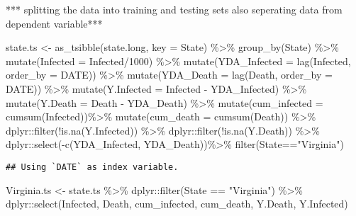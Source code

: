 \documentclass[
]{article}
\newenvironment{Shaded}{\begin{snugshade}}{\end{snugshade}}
\newcommand{\AttributeTok}[1]{\textcolor[rgb]{0.77,0.63,0.00}{#1}}
\newcommand{\DecValTok}[1]{\textcolor[rgb]{0.00,0.00,0.81}{#1}}
\newcommand{\FunctionTok}[1]{\textcolor[rgb]{0.00,0.00,0.00}{#1}}
\newcommand{\NormalTok}[1]{#1}
\newcommand{\OtherTok}[1]{\textcolor[rgb]{0.56,0.35,0.01}{#1}}
\newcommand{\SpecialCharTok}[1]{\textcolor[rgb]{0.00,0.00,0.00}{#1}}
\newcommand{\StringTok}[1]{\textcolor[rgb]{0.31,0.60,0.02}{#1}}
\begin{document}
*** splitting the data into training and testing sets also seperating
data from dependent variable***

\begin{Shaded}
\begin{Highlighting}[]
\NormalTok{state.ts }\OtherTok{\textless{}{-}} \FunctionTok{as\_tsibble}\NormalTok{(state.long, }\AttributeTok{key =}\NormalTok{ State) }\SpecialCharTok{\%\textgreater{}\%}
\FunctionTok{group\_by}\NormalTok{(State) }\SpecialCharTok{\%\textgreater{}\%}
\FunctionTok{mutate}\NormalTok{(}\AttributeTok{Infected =}\NormalTok{ Infected}\SpecialCharTok{/}\DecValTok{1000}\NormalTok{) }\SpecialCharTok{\%\textgreater{}\%}
\FunctionTok{mutate}\NormalTok{(}\AttributeTok{YDA\_Infected =} \FunctionTok{lag}\NormalTok{(Infected, }\AttributeTok{order\_by =}\NormalTok{ DATE)) }\SpecialCharTok{\%\textgreater{}\%}
\FunctionTok{mutate}\NormalTok{(}\AttributeTok{YDA\_Death =} \FunctionTok{lag}\NormalTok{(Death, }\AttributeTok{order\_by =}\NormalTok{ DATE)) }\SpecialCharTok{\%\textgreater{}\%}
\FunctionTok{mutate}\NormalTok{(}\AttributeTok{Y.Infected =}\NormalTok{ Infected }\SpecialCharTok{{-}}\NormalTok{ YDA\_Infected) }\SpecialCharTok{\%\textgreater{}\%}
\FunctionTok{mutate}\NormalTok{(}\AttributeTok{Y.Death =}\NormalTok{ Death }\SpecialCharTok{{-}}\NormalTok{ YDA\_Death) }\SpecialCharTok{\%\textgreater{}\%}
\FunctionTok{mutate}\NormalTok{(}\AttributeTok{cum\_infected =} \FunctionTok{cumsum}\NormalTok{(Infected))}\SpecialCharTok{\%\textgreater{}\%}
\FunctionTok{mutate}\NormalTok{(}\AttributeTok{cum\_death =} \FunctionTok{cumsum}\NormalTok{(Death)) }\SpecialCharTok{\%\textgreater{}\%}
\NormalTok{dplyr}\SpecialCharTok{::}\FunctionTok{filter}\NormalTok{(}\SpecialCharTok{!}\FunctionTok{is.na}\NormalTok{(Y.Infected)) }\SpecialCharTok{\%\textgreater{}\%}
\NormalTok{dplyr}\SpecialCharTok{::}\FunctionTok{filter}\NormalTok{(}\SpecialCharTok{!}\FunctionTok{is.na}\NormalTok{(Y.Death)) }\SpecialCharTok{\%\textgreater{}\%}
\NormalTok{dplyr}\SpecialCharTok{::}\FunctionTok{select}\NormalTok{(}\SpecialCharTok{{-}}\FunctionTok{c}\NormalTok{(YDA\_Infected, YDA\_Death))}\SpecialCharTok{\%\textgreater{}\%}
\FunctionTok{filter}\NormalTok{(State}\SpecialCharTok{==}\StringTok{"Virginia"}\NormalTok{) }
\end{Highlighting}
\end{Shaded}

\begin{verbatim}
## Using `DATE` as index variable.
\end{verbatim}

\begin{Shaded}
\begin{Highlighting}[]
\NormalTok{Virginia.ts }\OtherTok{\textless{}{-}}\NormalTok{ state.ts }\SpecialCharTok{\%\textgreater{}\%}
\NormalTok{dplyr}\SpecialCharTok{::}\FunctionTok{filter}\NormalTok{(State }\SpecialCharTok{==} \StringTok{"Virginia"}\NormalTok{) }\SpecialCharTok{\%\textgreater{}\%}
\NormalTok{dplyr}\SpecialCharTok{::}\FunctionTok{select}\NormalTok{(Infected, Death, cum\_infected, cum\_death, Y.Death, Y.Infected)}
\end{Highlighting}
\end{Shaded}
\end{document}
